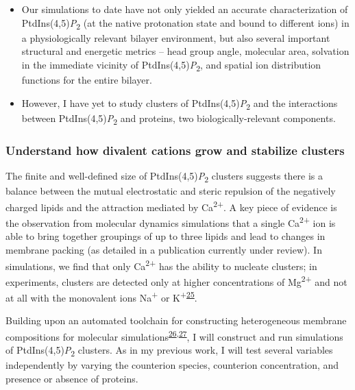 \documentclass[11pt,notitlepage]{article}
\providecommand{\tightlist}{%
  \setlength{\itemsep}{0pt}\setlength{\parskip}{0pt}}
\begin{document}
\begin{itemize}
\tightlist
\item
  Our simulations to date have not only yielded an accurate
  characterization of PtdIns(4,5)\emph{P}\textsubscript{2} (at the
  native protonation state and bound to different ions) in a
  physiologically relevant bilayer environment, but also several
  important structural and energetic metrics -- head group angle,
  molecular area, solvation in the immediate vicinity of
  PtdIns(4,5)\emph{P}\textsubscript{2}, and spatial ion distribution
  functions for the entire bilayer.
\item
  However, I have yet to study clusters of
  PtdIns(4,5)\emph{P}\textsubscript{2} and the interactions between
  PtdIns(4,5)\emph{P}\textsubscript{2} and proteins, two
  biologically-relevant components.
\end{itemize}

\hypertarget{understand-how-divalent-cations-grow-and-stabilize-clusters}{%
\subsubsection{Understand how divalent cations grow and stabilize
clusters}\label{understand-how-divalent-cations-grow-and-stabilize-clusters}}

The finite and well-defined size of PtdIns(4,5)\emph{P}\textsubscript{2}
clusters suggests there is a balance between the mutual electrostatic
and steric repulsion of the negatively charged lipids and the attraction
mediated by Ca\textsuperscript{2+}. A key piece of evidence is the
observation from molecular dynamics simulations that a single
Ca\textsuperscript{2+} ion is able to bring together groupings of up to
three lipids and lead to changes in membrane packing (as detailed in a
publication currently under review). In simulations, we find that only
Ca\textsuperscript{2+} has the ability to nucleate clusters; in
experiments, clusters are detected only at higher concentrations of
Mg\textsuperscript{2+} and not at all with the monovalent ions
Na\textsuperscript{+} or
K\textsuperscript{+}\textsuperscript{\protect\hyperlink{ref-JWXdIfNt}{25}}.

Building upon an automated toolchain for constructing heterogeneous
membrane compositions for molecular
simulations\textsuperscript{\protect\hyperlink{ref-14RTQvTQS}{26},\protect\hyperlink{ref-aHkuGDrS}{27}},
I will construct and run simulations of
PtdIns(4,5)\emph{P}\textsubscript{2} clusters. As in my previous work, I
will test several variables independently by varying the counterion
species, counterion concentration, and presence or absence of proteins.
\end{document}

